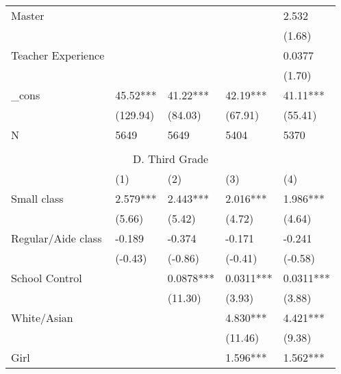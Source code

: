 \documentclass{article}
\begin{document}
{{{{{{{{{{{\begin{table}[htbp]
\begin{tabular}{lrllrr}
    \multicolumn{2}{l}{Master} &       &       & \multicolumn{1}{l}{} & \multicolumn{1}{l}{2.532} \\
          &       &       &       & \multicolumn{1}{l}{} & \multicolumn{1}{l}{(1.68)} \\
    \multicolumn{2}{l}{Teacher Experience} &       &       & \multicolumn{1}{l}{} & \multicolumn{1}{l}{0.0377} \\
          &       &       &       & \multicolumn{1}{l}{} & \multicolumn{1}{l}{(1.70)} \\
    \multicolumn{2}{l}{\_cons} & 45.52*** & 41.22*** & \multicolumn{1}{l}{42.19***} & \multicolumn{1}{l}{41.11***} \\
          &       & (129.94) & (84.03) & \multicolumn{1}{l}{(67.91)} & \multicolumn{1}{l}{(55.41)} \\
    \multicolumn{2}{l}{N} & 5649  & 5649  & \multicolumn{1}{l}{5404} & \multicolumn{1}{l}{5370} \\
          &       &       &       &       &  \\
    \midrule
    \multicolumn{6}{c}{D. Third Grade} \\
    \midrule
          &       & (1)   & (2)   & \multicolumn{1}{l}{(3)} & \multicolumn{1}{l}{(4)} \\
    \multicolumn{2}{l}{Small class} & 2.579*** & 2.443*** & \multicolumn{1}{l}{2.016***} & \multicolumn{1}{l}{1.986***} \\
          &       & (5.66) & (5.42) & \multicolumn{1}{l}{(4.72)} & \multicolumn{1}{l}{(4.64)} \\
    \multicolumn{2}{l}{Regular/Aide class} & -0.189 & -0.374 & \multicolumn{1}{l}{-0.171} & \multicolumn{1}{l}{-0.241} \\
          &       & (-0.43) & (-0.86) & \multicolumn{1}{l}{(-0.41)} & \multicolumn{1}{l}{(-0.58)} \\
    \multicolumn{2}{l}{School Control} &       & 0.0878*** & \multicolumn{1}{l}{0.0311***} & \multicolumn{1}{l}{0.0311***} \\
          &       &       & (11.30) & \multicolumn{1}{l}{(3.93)} & \multicolumn{1}{l}{(3.88)} \\
    \multicolumn{2}{l}{White/Asian} &       &       & \multicolumn{1}{l}{4.830***} & \multicolumn{1}{l}{4.421***} \\
          &       &       &       & \multicolumn{1}{l}{(11.46)} & \multicolumn{1}{l}{(9.38)} \\
    \multicolumn{2}{l}{Girl} &       &       & \multicolumn{1}{l}{1.596***} & \multicolumn{1}{l}{1.562***} \\

\end{tabular}
\end{table}}}}}}}}}}}}
\end{document}
